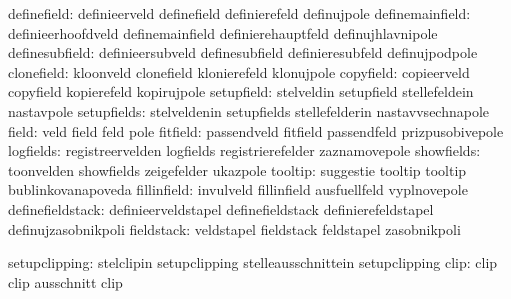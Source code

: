                   definefield:  definieerveld                definefield
                                definierefeld                definujpole
              definemainfield:  definieerhoofdveld           definemainfield
                                definierehauptfeld           definujhlavnipole
               definesubfield:  definieersubveld             definesubfield
                                definieresubfeld             definujpodpole
                   clonefield:  kloonveld                    clonefield
                                klonierefeld                 klonujpole
                    copyfield:  copieerveld                  copyfield
                                kopierefeld                  kopirujpole
                   setupfield:  stelveldin                   setupfield
                                stellefeldein                nastavpole
                  setupfields:  stelveldenin                 setupfields
                                stellefelderin               nastavvsechnapole
                        field:  veld                         field
                                feld                         pole
                     fitfield:  passendveld                  fitfield
                                passendfeld                  prizpusobivepole %
                    logfields:  registreervelden             logfields
                                registrierefelder            zaznamovepole
                   showfields:  toonvelden                   showfields
                                zeigefelder                  ukazpole
                      tooltip:  suggestie                    tooltip
                                tooltip                      bublinkovanapoveda
                  fillinfield:  invulveld                    fillinfield
                                ausfuellfeld                 vyplnovepole %
             definefieldstack:  definieerveldstapel          definefieldstack
                                definierefeldstapel          definujzasobnikpoli
                   fieldstack:  veldstapel                   fieldstack
                                feldstapel                   zasobnikpoli

                setupclipping:  stelclipin                   setupclipping 
                                stelleausschnittein          setupclipping  %
                         clip:  clip                         clip 
                                ausschnitt                   clip %


